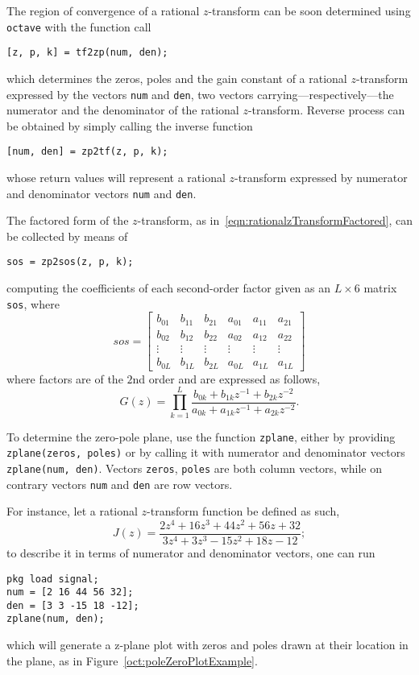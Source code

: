 \documentclass[\documentfontsize, twocolumn]{\classname}
\begin{document}
The region of convergence of a rational $z$-transform can be soon determined using \texttt{octave} with the function call
\begin{verbatim}
[z, p, k] = tf2zp(num, den);
\end{verbatim}
which determines the zeros, poles and the gain constant of a rational $z$-transform expressed by the vectors \texttt{num} and \texttt{den}, two vectors carrying---respectively---the numerator and the denominator of the rational $z$-transform. Reverse process can be obtained by simply calling the inverse function
\begin{verbatim}
[num, den] = zp2tf(z, p, k);
\end{verbatim}
whose return values will represent a rational $z$-transform expressed by numerator and denominator vectors \texttt{num} and \texttt{den}.

The factored form of the $z$-transform, as in~\ref{eqn:rationalzTransformFactored}, can be collected by means of
\begin{verbatim}
sos = zp2sos(z, p, k);
\end{verbatim}
computing the coefficients of each second-order factor given as an $L \times 6$ matrix \texttt{sos}, where
\[
    sos =
    \begin{bmatrix}
        b_{01} & b_{11} & b_{21} & a_{01} & a_{11} & a_{21} \\
        b_{02} & b_{12} & b_{22} & a_{02} & a_{12} & a_{22} \\
        \vdots & \vdots & \vdots & \vdots & \vdots & \vdots \\
        b_{0L} & b_{1L} & b_{2L} & a_{0L} & a_{1L} & a_{1L}
    \end{bmatrix}
\]
where factors are of the $2$nd order and are expressed as follows,
\begin{equation}\label{eqn:rationalzTransformFactoredSecondOrder}
    G(z) = \prod_{k=1}^L\frac{
        b_{0k} + b_{1k}z^{-1} + b_{2k}z^{-2}
    } {
        a_{0k} + a_{1k}z^{-1} + a_{2k}z^{-2}
    }.
\end{equation}

To determine the zero-pole plane, use the function \texttt{zplane}, either by providing \texttt{zplane(zeros, poles)} or by calling it with numerator and denominator vectors \texttt{zplane(num, den)}. Vectors \texttt{zeros}, \texttt{poles} are both column vectors, while on contrary vectors \texttt{num} and \texttt{den} are row vectors.

For instance, let a rational $z$-transform function be defined as such,
\[
    J(z) = \frac{
        2z^4 + 16z^3 + 44z^2 + 56z + 32
    } {
        3z^4 + 3z^3 - 15z^2 + 18z - 12
    };
\]
to describe it in terms of numerator and denominator vectors, one can run
\begin{verbatim}
pkg load signal;
num = [2 16 44 56 32];
den = [3 3 -15 18 -12];
zplane(num, den);
\end{verbatim}
which will generate a z-plane plot with zeros and poles drawn at their location in the plane, as in Figure~\ref{oct:poleZeroPlotExample}.
\end{document}

